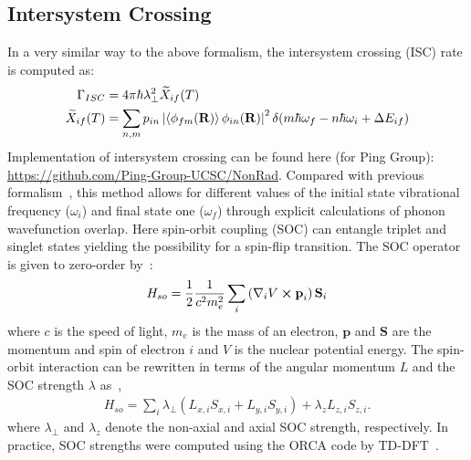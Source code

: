 \subsection{Intersystem Crossing}
In a very similar way to the above formalism, the intersystem crossing (ISC) rate is computed as:
\begin{align}
    \Gamma_{ISC} &= 4 \pi \hbar \lambda_\perp^2 \widetilde{X}_{if}(T) \label{intro:eq:isc-full}\\
    \widetilde{X}_{if}(T) &= \sum_{n,m}p_{in} \left|
        \braket{\phi_{fm}(\textbf{R})}{\phi_{in}(\mathbf{R})}
    \right|^2 \delta(m\hbar\omega_f - n\hbar\omega_i+\Delta E_{if}) \label{intro:eq:isc-F}
\end{align}
Implementation of intersystem crossing can be found here (for Ping Group): \url{https://github.com/Ping-Group-UCSC/NonRad}.
Compared with previous formalism~\cite{thiering2017ab}, this method allows for different values of the initial state vibrational frequency ($\omega_i$) and final state one ($\omega_f$) through explicit calculations of phonon wavefunction overlap. Here spin-orbit coupling (SOC) can entangle triplet and singlet states yielding the possibility for a spin-flip transition. The SOC operator is given to zero-order by~\cite{maze2011properties}:
\begin{align}
    H_{so} = \frac{1}{2} \frac{1}{c^2m_e^2} \sum_i \left(
        \nabla_i V \cross \textbf{p}_i \right) \textbf{S}_i \label{intro:eq:soc-full}
\end{align}
where $c$ is the speed of light, $m_e$ is the mass of an electron, $\textbf{p}$ and $\textbf{S}$ are the momentum and spin of electron $i$ and $V$ is the nuclear potential energy. The spin-orbit interaction can be rewritten in terms of the angular momentum $L$ and the SOC strength $\lambda$ as~\cite{maze2011properties},
\begin{align}
    H_{so} = \sum_i \lambda_{\perp} (L_{x,i}S_{x,i} + L_{y,i}S_{y,i}) + \lambda_z L_{z,i}S_{z,i}.
\end{align}
where $\lambda_{\perp}$ and $\lambda_z$ denote the non-axial and axial SOC strength, respectively. In practice, SOC strengths were computed using the ORCA code by TD-DFT~\cite{neese2012orca,de2019predicting}.
